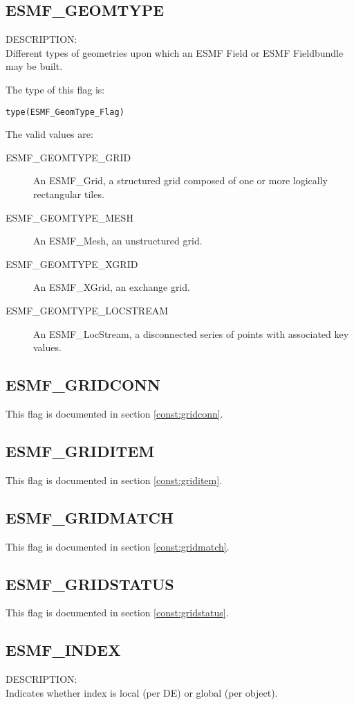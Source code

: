 \subsection{ESMF\_GEOMTYPE}
\label{const:geomtype}

{\sf DESCRIPTION:\\}
 Different types of geometries upon which an ESMF Field or ESMF Fieldbundle may
be built. 

The type of this flag is:

{\tt type(ESMF\_GeomType\_Flag)}

The valid values are:
\begin{description}
\item [ESMF\_GEOMTYPE\_GRID]
      An ESMF\_Grid, a structured grid composed of one or more logically rectangular tiles.
\item [ESMF\_GEOMTYPE\_MESH]
      An ESMF\_Mesh, an unstructured grid.
\item [ESMF\_GEOMTYPE\_XGRID]
      An ESMF\_XGrid, an exchange grid.
\item [ESMF\_GEOMTYPE\_LOCSTREAM]
      An ESMF\_LocStream, a disconnected series of points with associated key values.
\end{description}

\subsection{ESMF\_GRIDCONN}
This flag is documented in section \ref{const:gridconn}.

\subsection{ESMF\_GRIDITEM}
This flag is documented in section \ref{const:griditem}.

\subsection{ESMF\_GRIDMATCH}
This flag is documented in section \ref{const:gridmatch}.

\subsection{ESMF\_GRIDSTATUS}
This flag is documented in section \ref{const:gridstatus}.

\subsection{ESMF\_INDEX}
\label{const:indexflag}
{\sf DESCRIPTION:\\}
Indicates whether index is local (per DE) or global (per object).

